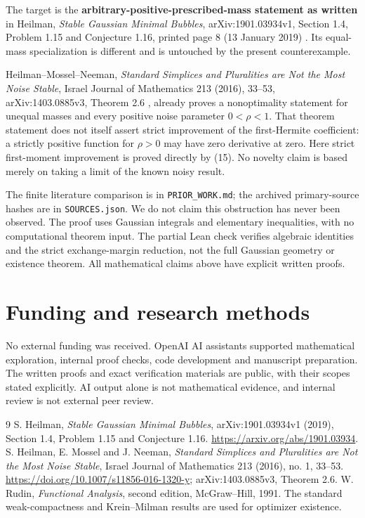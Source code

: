 \documentclass[
  11pt,
]{article}
\begin{document}
The target is the \textbf{arbitrary-positive-prescribed-mass statement
as written} in Heilman, \emph{Stable Gaussian Minimal Bubbles},
arXiv:1901.03934v1, Section 1.4, Problem 1.15 and Conjecture 1.16,
printed page 8 (13 January 2019) \cite{H19}. Its equal-mass specialization is
different and is untouched by the present counterexample.

Heilman--Mossel--Neeman, \emph{Standard Simplices and Pluralities are
Not the Most Noise Stable}, Israel Journal of Mathematics 213 (2016),
33--53, arXiv:1403.0885v3, Theorem 2.6 \cite{HMN16}, already proves a nonoptimality
statement for unequal masses and every positive noise parameter
\(0<\rho<1\). That theorem statement does not itself assert strict
improvement of the first-Hermite coefficient: a strictly positive
function for \(\rho>0\) may have zero derivative at zero. Here strict
first-moment improvement is proved directly by (15). No novelty claim is
based merely on taking a limit of the known noisy result.

The finite literature comparison is in \texttt{PRIOR\_WORK.md}; the
archived primary-source hashes are in \texttt{SOURCES.json}. We do not
claim this obstruction has never been observed. The proof uses Gaussian
integrals and elementary inequalities, with no computational theorem
input. The partial Lean check verifies algebraic identities and the
strict exchange-margin reduction, not the full Gaussian geometry or
existence theorem. All mathematical claims above have explicit written
proofs.


\section*{Funding and research methods}
No external funding was received. OpenAI AI assistants supported
mathematical exploration, internal proof checks, code development and
manuscript preparation. The written proofs and exact verification
materials are public, with their scopes stated explicitly. AI output
alone is not mathematical evidence, and internal review is not external
peer review.

\begin{thebibliography}{9}
 S. Heilman, \emph{Stable Gaussian Minimal Bubbles},
arXiv:1901.03934v1 (2019), Section 1.4, Problem 1.15 and Conjecture 1.16.
\url{https://arxiv.org/abs/1901.03934}.
 S. Heilman, E. Mossel and J. Neeman,
\emph{Standard Simplices and Pluralities are Not the Most Noise Stable},
Israel Journal of Mathematics 213 (2016), no. 1, 33--53.
\url{https://doi.org/10.1007/s11856-016-1320-y}; arXiv:1403.0885v3,
Theorem 2.6.
 W. Rudin, \emph{Functional Analysis}, second edition,
McGraw--Hill, 1991. The standard weak-compactness and Krein--Milman
results are used for optimizer existence.
\end{thebibliography}
\end{document}
